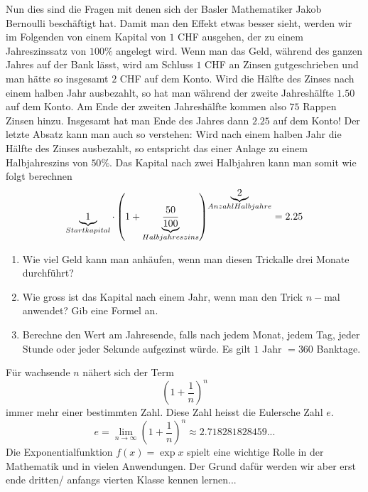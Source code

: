 \documentclass[11pt,oneside]{article}
\begin{document}
	Nun dies sind die Fragen mit denen sich der Basler Mathematiker Jakob Bernoulli beschäftigt hat. Damit man den Effekt etwas besser sieht, werden wir im Folgenden von einem Kapital von $1$ CHF ausgehen, der zu einem Jahreszinssatz von $100\%$ angelegt wird. Wenn man das Geld, während des ganzen Jahres auf der Bank lässt, wird am Schluss $1$ CHF an Zinsen gutgeschrieben und man hätte so insgesamt $2$ CHF auf dem Konto.
	Wird die Hälfte des Zinses nach einem halben Jahr ausbezahlt, so hat man während der zweite Jahreshälfte $1.50$ auf dem Konto. Am Ende der zweiten Jahreshälfte kommen also $75$ Rappen Zinsen hinzu. Insgesamt hat man Ende des Jahres dann $2.25$ auf dem Konto!\newline
	Der letzte Absatz kann man auch so verstehen: Wird nach einem halben Jahr die Hälfte des Zinses ausbezahlt, so entspricht das einer Anlage zu einem Halbjahreszins von $50\%$. Das Kapital nach zwei Halbjahren kann man somit wie folgt berechnen
	\[\underbrace{1}_{\substack{Startkapital}}\cdot \left(1+\underbrace{\frac{50}{100}}_{\substack{Halbjahreszins}}\right)^{\underbrace{2}_{\substack{Anzahl Halbjahre}}}=2.25\]
	\begin{enumerate}
		\item Wie viel Geld kann man anhäufen, wenn man diesen \glqq Trick\grqq\:alle drei Monate durchführt?\vspace{5pt}\newline{}
		\item Wie gross ist das Kapital nach einem Jahr, wenn man den \glqq Trick\grqq\: $n-$mal anwendet? Gib eine Formel an.\vspace{5pt}\newline{}
		\item Berechne den Wert am Jahresende, falls nach jedem Monat, jedem Tag, jeder Stunde oder jeder Sekunde aufgezinst würde. Es gilt $1$ Jahr $ = 360$ Banktage.\vspace{5pt}\newline{}
	\end{enumerate}
	\begin{definition}
		Für wachsende $n$ nähert sich der Term \[\left(1+\frac{1}{n}\right)^n\] immer mehr einer bestimmten Zahl. Diese Zahl heisst die Eulersche Zahl $e$. \[e=\lim_{n\rightarrow\infty}\left(1+\frac{1}{n}\right)^n\approx2.718281828459...\]
		Die Exponentialfunktion $f(x)=\exp{x}$ spielt eine wichtige Rolle in der Mathematik und in vielen Anwendungen. Der Grund dafür werden wir aber erst ende dritten/ anfangs vierten Klasse kennen lernen...
	\end{definition}
\end{document}
